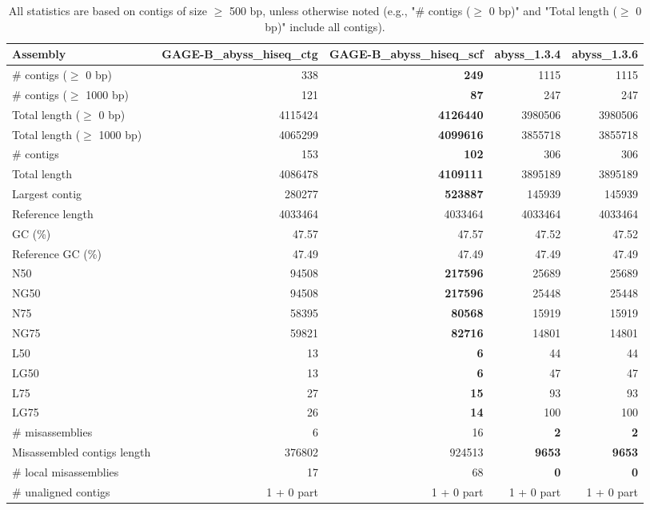 \documentclass[12pt,a4paper]{article}
\begin{document}
\begin{table}[ht]
\begin{center}
\caption{All statistics are based on contigs of size $\geq$ 500 bp, unless otherwise noted (e.g., "\# contigs ($\geq$ 0 bp)" and "Total length ($\geq$ 0 bp)" include all contigs).}
\begin{tabular}{|l*{4}{|r}|}
\hline
Assembly & GAGE-B\_abyss\_hiseq\_ctg & GAGE-B\_abyss\_hiseq\_scf & abyss\_1.3.4 & abyss\_1.3.6 \\ \hline
\# contigs ($\geq$ 0 bp) & 338 & {\bf 249} & 1115 & 1115 \\ \hline
\# contigs ($\geq$ 1000 bp) & 121 & {\bf 87} & 247 & 247 \\ \hline
Total length ($\geq$ 0 bp) & 4115424 & {\bf 4126440} & 3980506 & 3980506 \\ \hline
Total length ($\geq$ 1000 bp) & 4065299 & {\bf 4099616} & 3855718 & 3855718 \\ \hline
\# contigs & 153 & {\bf 102} & 306 & 306 \\ \hline
Total length & 4086478 & {\bf 4109111} & 3895189 & 3895189 \\ \hline
Largest contig & 280277 & {\bf 523887} & 145939 & 145939 \\ \hline
Reference length & 4033464 & 4033464 & 4033464 & 4033464 \\ \hline
GC (\%) & 47.57 & 47.57 & 47.52 & 47.52 \\ \hline
Reference GC (\%) & 47.49 & 47.49 & 47.49 & 47.49 \\ \hline
N50 & 94508 & {\bf 217596} & 25689 & 25689 \\ \hline
NG50 & 94508 & {\bf 217596} & 25448 & 25448 \\ \hline
N75 & 58395 & {\bf 80568} & 15919 & 15919 \\ \hline
NG75 & 59821 & {\bf 82716} & 14801 & 14801 \\ \hline
L50 & 13 & {\bf 6} & 44 & 44 \\ \hline
LG50 & 13 & {\bf 6} & 47 & 47 \\ \hline
L75 & 27 & {\bf 15} & 93 & 93 \\ \hline
LG75 & 26 & {\bf 14} & 100 & 100 \\ \hline
\# misassemblies & 6 & 16 & {\bf 2} & {\bf 2} \\ \hline
Misassembled contigs length & 376802 & 924513 & {\bf 9653} & {\bf 9653} \\ \hline
\# local misassemblies & 17 & 68 & {\bf 0} & {\bf 0} \\ \hline
\# unaligned contigs & 1 + 0 part & 1 + 0 part & 1 + 0 part & 1 + 0 part \\ \hline

\end{tabular}
\end{center}
\end{table}
\end{document}
